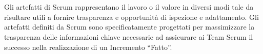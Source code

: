 
\section*{\color{Blue}{Gli Artefatti di Scrum}}
\label{sec:artifacts}
Gli artefatti di Scrum rappresentano il lavoro o il valore in diversi modi tale da risultare utili a fornire trasparenza e 
opportunit\`a di ispezione e adattamento. Gli artefatti definiti da Scrum sono specificatamente progettati per massimizzare la 
trasparenza delle informazioni chiave necessarie ad assicurare ai Team Scrum il successo nella realizzazione di un Incremento 
``Fatto''.

